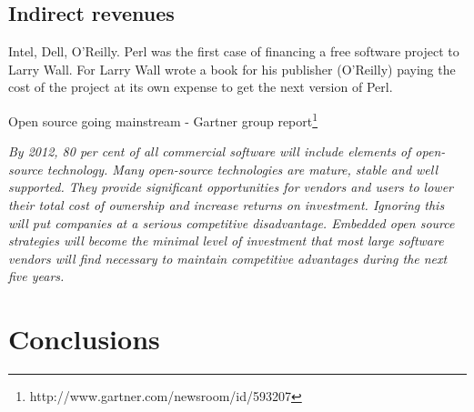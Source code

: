 \subsection{Indirect revenues}

Intel, Dell, O'Reilly. Perl was the first case of financing a free software
 project to Larry Wall. For Larry Wall wrote a book for his publisher (O'Reilly)
  paying the cost of the project at its own expense to get 
  the next version of Perl.


Open source going mainstream - Gartner group 
report\footnote{http://www.gartner.com/newsroom/id/593207}

\emph{By 2012, 80 per cent of all commercial software will include elements of
 open-source technology. Many open-source technologies are mature, stable and
  well supported. They provide significant opportunities for vendors and users
   to lower their total cost of ownership and increase returns on investment. 
   Ignoring this will put companies at a serious competitive disadvantage. 
   Embedded open source strategies will become the minimal level of investment
    that most large software vendors will find necessary to maintain
     competitive advantages during the next five years.}

\section{Conclusions}\label{conclusions}
